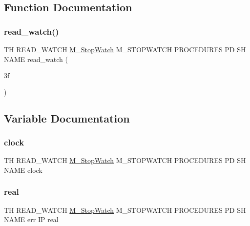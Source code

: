 \subsection{Function Documentation}
\mbox{\label{read__watch_83_8txt_a9a59c617348dee220b1c77cbc6d39050}} 
\subsubsection{\texorpdfstring{read\+\_\+watch()}{read\_watch()}}
{\footnotesize\ttfamily TH R\+E\+A\+D\+\_\+\+W\+A\+T\+CH \hyperlink{option__stopwatch_83_8txt_aa2011fc45a5e502e87ee50996a8a9305}{M\+\_\+\+Stop\+Watch} M\+\_\+\+S\+T\+O\+P\+W\+A\+T\+CH P\+R\+O\+C\+E\+D\+U\+R\+ES PD SH N\+A\+ME read\+\_\+watch (\begin{DoxyParamCaption}\item[{3f}]{ }\end{DoxyParamCaption})}



\subsection{Variable Documentation}
\mbox{\label{read__watch_83_8txt_a6b8c46608167c7c707dcc341e6a30f47}} 
\subsubsection{\texorpdfstring{clock}{clock}}
{\footnotesize\ttfamily TH R\+E\+A\+D\+\_\+\+W\+A\+T\+CH \hyperlink{option__stopwatch_83_8txt_aa2011fc45a5e502e87ee50996a8a9305}{M\+\_\+\+Stop\+Watch} M\+\_\+\+S\+T\+O\+P\+W\+A\+T\+CH P\+R\+O\+C\+E\+D\+U\+R\+ES PD SH N\+A\+ME clock}

\mbox{\label{read__watch_83_8txt_abdb62bde002f38ef75f810d3a905a823}} 
\subsubsection{\texorpdfstring{real}{real}}
{\footnotesize\ttfamily TH R\+E\+A\+D\+\_\+\+W\+A\+T\+CH \hyperlink{option__stopwatch_83_8txt_aa2011fc45a5e502e87ee50996a8a9305}{M\+\_\+\+Stop\+Watch} M\+\_\+\+S\+T\+O\+P\+W\+A\+T\+CH P\+R\+O\+C\+E\+D\+U\+R\+ES PD SH N\+A\+ME err IP real}

